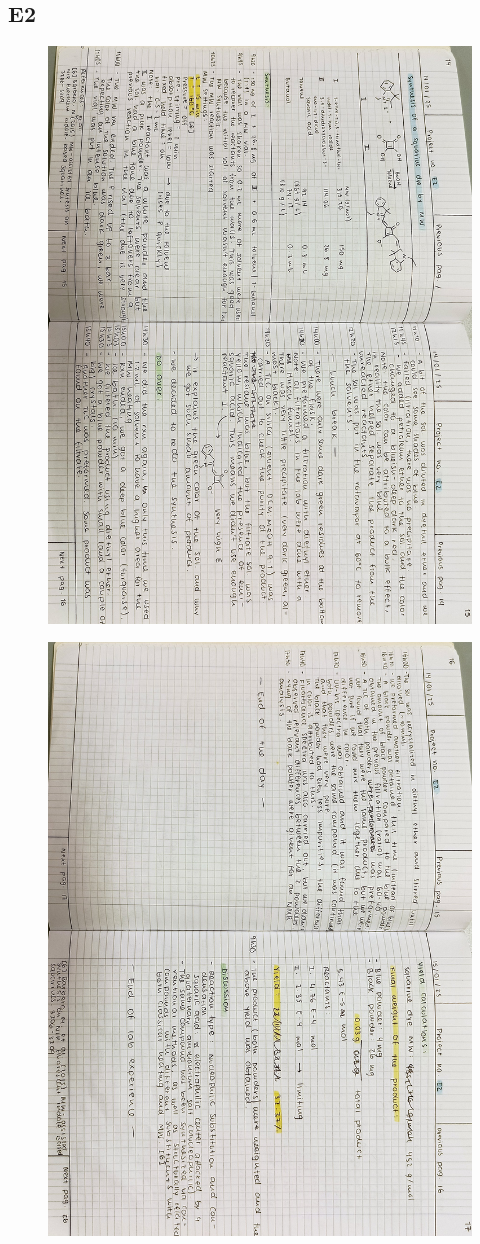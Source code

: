 \subsection{E2}
\begin{figure}[H]
	\centering
	\includegraphics[width=0.6\linewidth, angle=90]{../images/compressed/IMG20250123172951.jpg}
\end{figure}
\begin{figure}[H]
	\centering
	\includegraphics[width=0.6\linewidth, angle=90]{../images/compressed/IMG20250123173003.jpg}
\end{figure}


